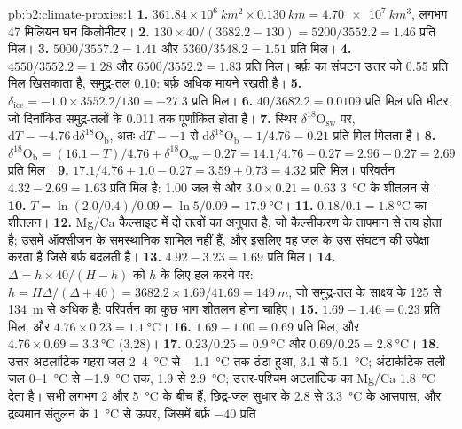 \begin{solution}{pb:b2:climate-proxies:1}
\textbf{1.} $361.84 \times 10^6\ \unit{km^2} \times \qty{0.130}{km} = \qty{4.70e7}{km^3}$, लगभग 47
मिलियन घन किलोमीटर।
\textbf{2.} $130 \times 40/(3682.2 - 130) = 5200/3552.2 = 1.46$ प्रति मिल।
\textbf{3.} $5000/3557.2 = 1.41$ और $5360/3548.2 = 1.51$ प्रति मिल।
\textbf{4.} $4550/3552.2 = 1.28$ और $6500/3552.2 = 1.83$ प्रति मिल। बर्फ़ का संघटन
उत्तर को \num{0.55} प्रति मिल खिसकाता है, समुद्र-तल \num{0.10}: बर्फ़ अधिक मायने रखती है।
\textbf{5.} $\delta_{\mathrm{ice}} = -1.0 \times 3552.2/130 = -27.3$ प्रति मिल।
\textbf{6.} $40/3682.2 = 0.0109$ प्रति मिल प्रति मीटर, जो दिनांकित समुद्र-तलों के \num{0.011} तक
पूर्णांकित होता है।
\textbf{7.} स्थिर $\delta^{18}\mathrm{O}_{\mathrm{sw}}$ पर, $\mathrm{d}T = -4.76\,\mathrm{d}\delta^{18}
\mathrm{O}_{\mathrm{b}}$, अतः $\mathrm{d}T = -1$ से $\mathrm{d}\delta^{18}\mathrm{O}_{\mathrm{b}} =
1/4.76 = 0.21$ प्रति मिल मिलता है।
\textbf{8.} $\delta^{18}\mathrm{O}_{\mathrm{b}} = (16.1 - T)/4.76 + \delta^{18}\mathrm{O}_{\mathrm{sw}}
- 0.27 = 14.1/4.76 - 0.27 = 2.96 - 0.27 = 2.69$ प्रति मिल।
\textbf{9.} $17.1/4.76 + 1.0 - 0.27 = 3.59 + 0.73 = 4.32$ प्रति मिल। परिवर्तन $4.32 - 2.69 =
1.63$ प्रति मिल है: \num{1.00} जल से और $3.0 \times 0.21 = 0.63$
\qty{3}{\celsius} के शीतलन से।
\textbf{10.} $T = \ln(2.0/0.4)/0.09 = \ln 5/0.09 = \qty{17.9}{\celsius}$।
\textbf{11.} $0.18/0.1 = \qty{1.8}{\celsius}$ का शीतलन।
\textbf{12.} Mg/Ca कैल्साइट में दो तत्वों का अनुपात है, जो कैल्सीकरण के तापमान से
तय होता है; उसमें ऑक्सीजन के समस्थानिक शामिल नहीं हैं, और इसलिए वह जल के उस संघटन की
उपेक्षा करता है जिसे बर्फ़ बदलती है।
\textbf{13.} $4.92 - 3.23 = 1.69$ प्रति मिल।
\textbf{14.} $\Delta = h \times 40/(H - h)$ को $h$ के लिए हल करने पर: $h = H\Delta/(\Delta + 40) = 3682.2
\times 1.69/41.69 = \qty{149}{m}$, जो समुद्र-तल के साक्ष्य के 125 से \qty{134}{m} से अधिक है:
परिवर्तन का कुछ भाग शीतलन होना चाहिए।
\textbf{15.} $1.69 - 1.46 = 0.23$ प्रति मिल, और $4.76 \times 0.23 = \qty{1.1}{\celsius}$।
\textbf{16.} $1.69 - 1.00 = 0.69$ प्रति मिल, और $4.76 \times 0.69 = \qty{3.3}{\celsius}$ (3.28)।
\textbf{17.} $0.23/0.25 = \qty{0.9}{\celsius}$ और $0.69/0.25 = \qty{2.8}{\celsius}$।
\textbf{18.} उत्तर अटलांटिक गहरा जल 2--\qty{4}{\celsius} से \qty{-1.1}{\celsius} तक ठंडा हुआ,
3.1 से \qty{5.1}{\celsius}; अंटार्कटिक तली जल 0--\qty{1}{\celsius} से
\qty{-1.9}{\celsius} तक, 1.9 से \qty{2.9}{\celsius}; उत्तर-पश्चिम अटलांटिक का Mg/Ca
\qty{1.8}{\celsius} देता है। सभी लगभग 2 और \qty{5}{\celsius} के बीच हैं, छिद्र-जल सुधार के 2.8 से
\qty{3.3}{\celsius} के आसपास, और द्रव्यमान संतुलन के \qty{1}{\celsius} से ऊपर, जिसमें बर्फ़ $-40$ प्रति

\end{solution}
